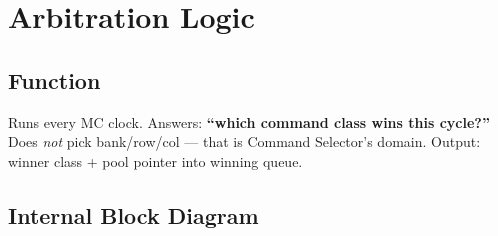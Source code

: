 \documentclass[11pt,a4paper]{article}
\begin{document}
\section{Arbitration Logic}

\subsection{Function}

Runs every MC clock. Answers: \textbf{``which command class wins this cycle?''}
Does \emph{not} pick bank/row/col — that is Command Selector's domain.
Output: winner class + pool pointer into winning queue.

\subsection{Internal Block Diagram}
\end{document}
